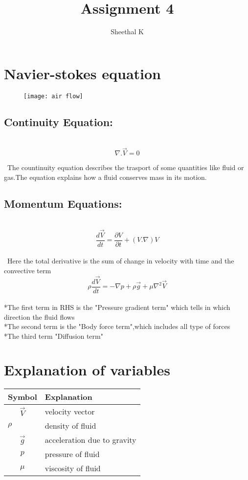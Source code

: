 \documentclass{article}
\title{Assignment 4}
\author{Sheethal K }
\begin{document}
\maketitle
\section{Navier-stokes equation}
\begin{figure}[h]
\centering\texttt{[image: air flow]}
\end{figure}
\subsection {Continuity Equation:}\\[1.2pt]

$$\nabla.\vec{V}=0$$


\large\ The countinuity equation describes the trasport of some quantities like fluid or gas.The equation explains how a fluid conserves mass in its motion.\\[1.2pt]
\subsection {Momentum Equations:}\\[1.5pt]

$$\frac{d\vec{V}}{dt}=\frac{\partial V}{\partial t} + (V.\nabla)V$$\\[0.9pt]
\ Here the total derivative is the sum of change in velocity with time and the convective term\\[1pt]
$$\rho\frac{d\vec{V}}{dt}=-\nabla{p} + \rho\vec{g}+\mu\nabla^{2}\vec{V}$$\\[1pt]
 *The first term in RHS is the "Pressure gradient term" which tells in which direction the fluid flows\\[1pt]

*The second term is the "Body force term",which includes all type of forces\\[1pt]

*The third term "Diffusion term" 
\section{Explanation of variables}
\begin{center}
\begin{tabular}{ | m{5cm} | m{9cm} | }   
   \hline
   \textbf{Symbol} & \textbf{Explanation} \\
   \hline
   $$\vec{V}$$ & velocity vector \\
   \hline
   $\rho$ & density of fluid \\
   \hline
   $$\vec{g}$$ & acceleration due to gravity \\
   \hline
   $${p}$$ & pressure of fluid \\
   \hline
   $$\mu$$ & viscosity of fluid \\
   \hline
\end{tabular}
\end{center}
\end{document}

